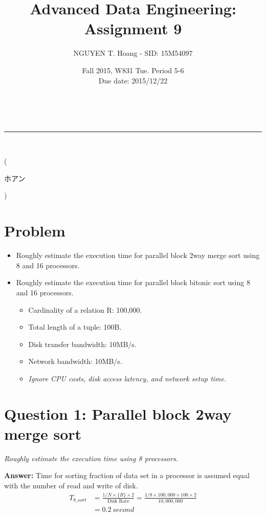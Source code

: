 \documentclass[a4paper,12pt]{article}
\makeatletter
\newcommand{\linia}{\rule{\linewidth}{0.5pt}}
\renewcommand{\maketitle} {
\begin{center}
\vspace{2ex}
{\LARGE \textsc{\@title}}
\vspace{1ex}
\\
\linia\\
\@author \hfill \@date
\vspace{4ex}
\end{center}
}
\makeatother
\begin{document}
\title{Advanced Data Engineering: Assignment 9}

\author{NGUYEN T. Hoang - SID: 15M54097}

\date{Fall 2015, W831 Tue. Period 5-6 \\ \hfill Due date: 2015/12/22}

\maketitle
\vspace{-4.5em}
\hspace{5.3em} (\begin{CJK}{UTF8}{min}ホアン\end{CJK})
\vspace{8em}
\section*{Problem}
\begin{itemize}
	\item Roughly estimate the execution time for parallel block 2way merge sort using 8 and 16 processors.
	\item Roughly estimate the execution time for parallel block bitonic sort using 8 and 16 processors.
\begin{itemize}
	\setlength{\parskip}{0cm}
	\setlength{\itemsep}{0cm}
	\item Cardinality of a relation R: 100,000.
	\item Total length of a tuple: 100B.
	\item Disk transfer bandwidth: 10MB/s.
	\item Network bandwidth: 10MB/s.
	\item \emph{Ignore CPU costs, disk access latency, and network setup time.}
\end{itemize}

\end{itemize}

\section*{Question 1: Parallel block 2way merge sort}
\setcounter{section}{1}

\textit{Roughly estimate the execution time using 8 processors.} 

\vspace{1.5em}
\noindent
\textbf{Answer:} 
\noindent
Time for sorting fraction of data set in a processor is assumed equal with the number of read and write of disk.
\begin{equation*}
	\begin{aligned}
		T_{8\_sort} & = \frac{1/N \times \{R\} \times 2}{\mbox{Disk Rate}}
		 = \frac{1/8 \times 100,000 \times 100 \times 2}{10,000,000} \\
		& = 0.2\ second
	\end{aligned}
\end{equation*}
\end{document}
